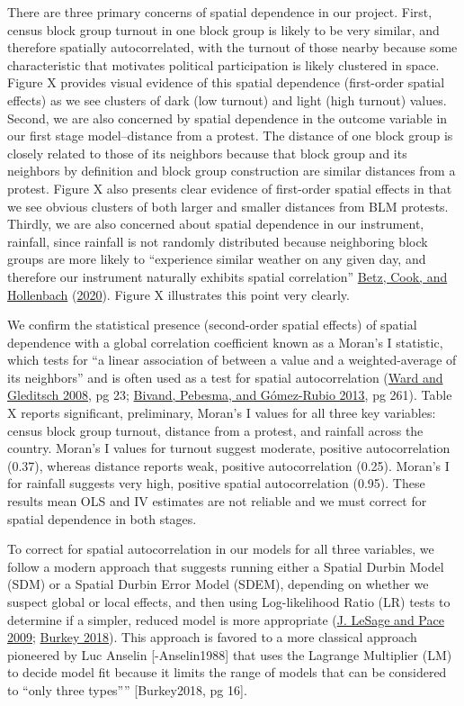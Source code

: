 \documentclass[
  12pt,
]{article}
\begin{document}
There are three primary concerns of spatial dependence in our project. First, census block group turnout in one block group is likely to be very similar, and therefore spatially autocorrelated, with the turnout of those nearby because some characteristic that motivates political participation is likely clustered in space. Figure X provides visual evidence of this spatial dependence (first-order spatial effects) as we see clusters of dark (low turnout) and light (high turnout) values. Second, we are also concerned by spatial dependence in the outcome variable in our first stage model--distance from a protest. The distance of one block group is closely related to those of its neighbors because that block group and its neighbors by definition and block group construction are similar distances from a protest. Figure X also presents clear evidence of first-order spatial effects in that we see obvious clusters of both larger and smaller distances from BLM protests. Thirdly, we are also concerned about spatial dependence in our instrument, rainfall, since rainfall is not randomly distributed because neighboring block groups are more likely to ``experience similar weather on any given day, and therefore our instrument naturally exhibits spatial correlation'' \protect\hyperlink{ref-Betz2020}{Betz, Cook, and Hollenbach} (\protect\hyperlink{ref-Betz2020}{2020}). Figure X illustrates this point very clearly.

We confirm the statistical presence (second-order spatial effects) of spatial dependence with a global correlation coefficient known as a Moran's I statistic, which tests for ``a linear association of between a value and a weighted-average of its neighbors'' and is often used as a test for spatial autocorrelation (\protect\hyperlink{ref-Ward2008}{Ward and Gleditsch 2008}, pg 23; \protect\hyperlink{ref-Bivand2013}{Bivand, Pebesma, and Gómez-Rubio 2013}, pg 261). Table X reports significant, preliminary, Moran's I values for all three key variables: census block group turnout, distance from a protest, and rainfall across the country. Moran's I values for turnout suggest moderate, positive autocorrelation (0.37), whereas distance reports weak, positive autocorrelation (0.25). Moran's I for rainfall suggests very high, positive spatial autocorrelation (0.95). These results mean OLS and IV estimates are not reliable and we must correct for spatial dependence in both stages.

To correct for spatial autocorrelation in our models for all three variables, we follow a modern approach that suggests running either a Spatial Durbin Model (SDM) or a Spatial Durbin Error Model (SDEM), depending on whether we suspect global or local effects, and then using Log-likelihood Ratio (LR) tests to determine if a simpler, reduced model is more appropriate (\protect\hyperlink{ref-LeSage2009}{J. LeSage and Pace 2009}; \protect\hyperlink{ref-Burkey2018}{Burkey 2018}). This approach is favored to a more classical approach pioneered by Luc Anselin {[}-Anselin1988{]} that uses the Lagrange Multiplier (LM) to decide model fit because it limits the range of models that can be considered to ``only three types'''' {[}Burkey2018, pg 16{]}.
\end{document}
